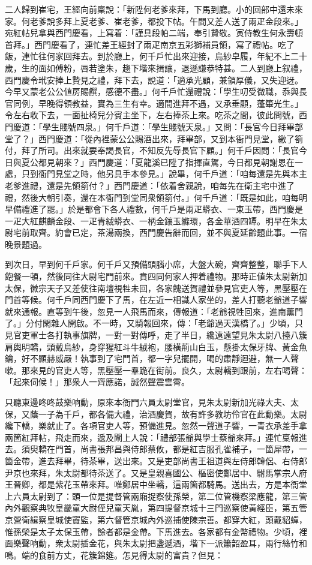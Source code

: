 二人歸到崔宅，王經向前稟說：「新陞何老爹來拜，下馬到廳。小的回部中還未來家。何老爹說多拜上夏老爹、崔老爹，都投下帖。午間又差人送了兩疋金段來。」宛紅帖兒拿與西門慶看，上寫着：「謹具段帕二端，奉引贄敬。寅侍教生何永壽頓首拜。」西門慶看了，連忙差王經封了兩疋南京五彩獅補員領，寫了禮帖。吃了飯，連忙往何家回拜去。到於廳上，何千戶忙出來迎接，烏紗皁履，年紀不上二十歲，生的面如傅粉，唇若塗朱，趨下堦來揖讓，退遜謙恭特甚。二人到廳上叙禮，西門慶令玳安捧上贄見之禮，拜下去，說道：「適承光顧，兼領厚儀，又失迎迓。今早又蒙老公公値房賜饌，感德不盡。」何千戶忙還禮說：「學生叨受微職，忝與長官同例，早晚得領教益，實為三生有幸。適間進拜不遇，又承垂顧，蓬篳光生。」令左右收下去，一面扯椅兒分賓主坐下，左右捧茶上來。吃茶之間，彼此問號，西門慶道：「學生賤號四泉。」何千戶道：「學生賤號天泉。」又問：「長官今日拜畢部堂了？」西門慶道：「從內裡蒙公公賜酒出來，拜畢部，又到本衙門見堂，繳了箚付，拜了所司。出來就要奉謁長官，不知反先辱長官下顧。」何千戶因問：「長官今日與夏公都見朝來？」西門慶道：「夏龍溪已陞了指揮直駕，今日都見朝謝恩在一處，只到衙門見堂之時，他另具手本參見。」說畢，何千戶道：「咱每還是先與本主老爹進禮，還是先領箚付？」西門慶道：「依着舍親說，咱每先在衛主宅中進了禮，然後大朝引奏，還在本衙門到堂同衆領箚付。」何千戶道：「既是如此，咱每明早備禮進了罷。」於是都會下各人禮數，何千戶是兩疋蟒衣、一束玉帶，西門慶是一疋大紅麒麟金段、一疋青絨蟒衣、一柄金鑲玉縧環，各金華酒四罈。明早在朱太尉宅前取齊。約會已定，茶湯兩換，西門慶告辭而回，並不與夏延齡題此事。一宿晚景題過。

到次日，早到何千戶家。何千戶又預備頭腦小席，大盤大碗，齊齊整整，聯手下人飽餐一頓，然後同往大尉宅門前來。賁四同何家人押着禮物。那時正値朱太尉新加太保，徽宗天子又差使往南壇視牲未回，各家餽送賀禮並參見官吏人等，黑壓壓在門首等候。何千戶同西門慶下了馬，在左近一相識人家坐的，差人打聽老爺道子響就來通報。直等到午後，忽見一人飛馬而來，傳報道：「老爺視牲回來，進南薰門了。」分付閑雜人開啟。不一時，又騎報回來，傳：「老爺過天漢橋了。」少頃，只見官吏軍士各打執事旗牌，一對一對傳呼，走了半日，纔遠遠望見朱太尉八擡八簇肩輿明轎，頭戴烏紗，身穿猩紅斗牛絨袍，腰橫荊山白玉，懸掛太保牙牌、黃金魚鑰，好不顯赫威嚴！執事到了宅門首，都一字兒擺開，喝的肅靜迴避，無一人聲嗽。那來見的官吏人等，黑壓壓一羣跪在街前。良久，太尉轎到跟前，左右喝聲：「起來伺候！」那衆人一齊應諾，誠然聲震雲霄。

只聽東邊咚咚鼓樂响動，原來本衙門六員太尉堂官，見朱太尉新加光祿大夫、太保，又蔭一子為千戶，都各備大禮，治酒慶賀，故有許多教坊伶官在此動樂。太尉纔下轎，樂就止了。各項官吏人等，預備進見。忽然一聲道子響，一青衣承差手拿兩箇紅拜帖，飛走而來，遞及閘上人說：「禮部張爺與學士蔡爺來拜。」連忙稟報進去。須臾轎在門首，尚書張邦昌與侍郎蔡攸，都是紅吉服孔雀補子，一箇犀帶，一箇金帶，進去拜畢，待茶畢，送出來。又是吏部尚書王祖道與左侍郎韓侶、右侍郎尹京也來拜，朱太尉都待茶送了。又是皇親喜國公、樞密使鄭居中、駙馬掌宗人府王晉卿，都是紫花玉帶來拜。唯鄭居中坐轎，這兩箇都騎馬。送出去，方是本衙堂上六員太尉到了：頭一位是提督管兩廂捉察使孫榮，第二位管機察梁應龍，第三管內外觀察典牧皇畿童大尉侄兒童天胤，第四提督京城十三門巡察使黃經臣，第五管京營衛緝察皇城使竇監，第六督管京城內外巡捕使陳宗善。都穿大紅，頭戴貂蟬，惟孫榮是太子太保玉帶，餘者都是金帶。下馬進去。各家都有金幣禮物。{}少頃，裡面樂聲响動，衆太尉插金花，與朱太尉把盞遞酒，堦下一派簫韶盈耳，兩行絲竹和鳴。端的食前方丈，花簇錦筵。怎見得太尉的富貴？但見：

